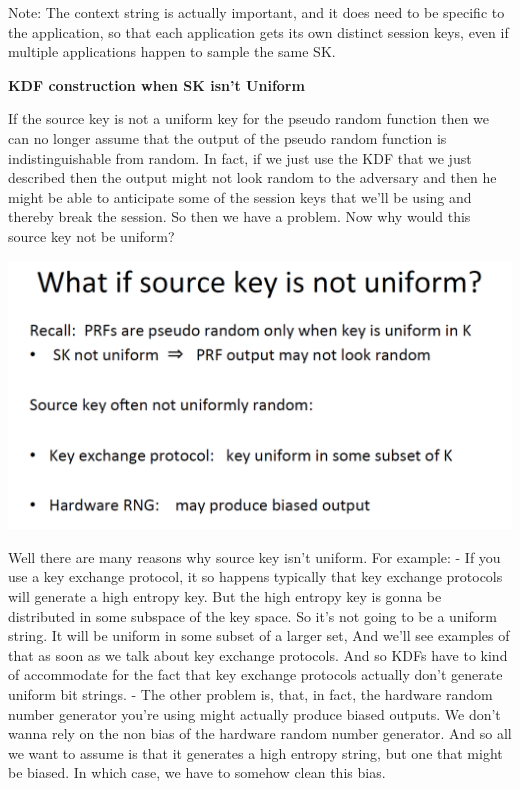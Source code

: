 \documentclass[11pt]{article}
\makeatletter
\def\maxwidth{\ifdim\Gin@nat@width>\linewidth\linewidth
    \else\Gin@nat@width\fi}
\let\Oldincludegraphics\includegraphics
\renewcommand{\includegraphics}[1]{\Oldincludegraphics[width=.8\maxwidth]{#1}}
\makeatother
\begin{document}
Note: The context string is actually important, and it does need to be
specific to the application, so that each application gets its own
distinct session keys, even if multiple applications happen to sample
the same SK.

\textbf{KDF construction when SK isn't Uniform}

If the source key is not a uniform key for the pseudo random function
then we can no longer assume that the output of the pseudo random
function is indistinguishable from random. In fact, if we just use the
KDF that we just described then the output might not look random to the
adversary and then he might be able to anticipate some of the session
keys that we'll be using and thereby break the session. So then we have
a problem. Now why would this source key not be uniform?

\includegraphics{./Images/NonUniformSK.png}

Well there are many reasons why source key isn't uniform. For example: -
If you use a key exchange protocol, it so happens typically that key
exchange protocols will generate a high entropy key. But the high
entropy key is gonna be distributed in some subspace of the key space.
So it's not going to be a uniform string. It will be uniform in some
subset of a larger set, And we'll see examples of that as soon as we
talk about key exchange protocols. And so KDFs have to kind of
accommodate for the fact that key exchange protocols actually don't
generate uniform bit strings. - The other problem is, that, in fact, the
hardware random number generator you're using might actually produce
biased outputs. We don't wanna rely on the non bias of the hardware
random number generator. And so all we want to assume is that it
generates a high entropy string, but one that might be biased. In which
case, we have to somehow clean this bias.
\end{document}
